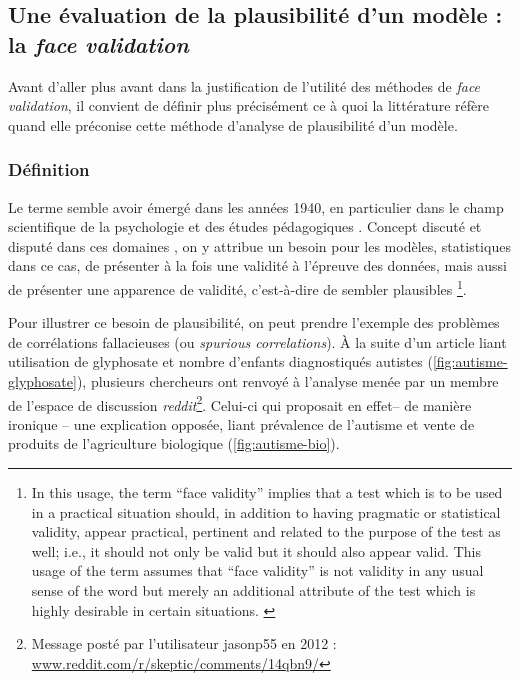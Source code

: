 \subsection{Une évaluation de la plausibilité d'un modèle : la \og \textit{face validation}\fg{}}\label{subsec:face-validity}

Avant d'aller plus avant dans la justification de l'utilité des méthodes de \textit{face validation}, il convient de définir plus précisément ce à quoi la littérature réfère quand elle préconise cette méthode d'analyse de plausibilité d'un modèle.

\subsubsection{Définition}
Le terme semble avoir émergé dans les années 1940, en particulier dans le champ scientifique de la psychologie et des études pédagogiques \autocite{nevo_face_1985}.
Concept discuté et disputé dans ces domaines \autocite{mosier_critical_1947}, on y attribue un besoin pour les modèles, statistiques dans ce cas, de présenter à la fois une validité à l'épreuve des données, mais aussi de présenter une apparence de validité, c'est-à-dire de sembler plausibles
\footnote{
	\og
	In this usage, the term ``face validity'' implies that a test which is to be used in a practical situation should, in addition to having pragmatic or statistical validity, appear practical, pertinent and related to the purpose of the test as well; i.e., it should not only be valid but it should also appear valid.
	This usage of the term assumes that ``face validity'' is not validity in any usual sense of the word but merely an additional attribute of the test which is highly desirable in certain situations.
	\fg{} \textcite[192]{mosier_critical_1947}
}.

Pour illustrer ce besoin de \og plausibilité\fg{}, on peut prendre l'exemple des problèmes de corrélations fallacieuses (ou \og \textit{spurious correlations}\fg{}).
À la suite d'un article \autocite{shaw_elevated_2017} liant utilisation de glyphosate et nombre d'enfants diagnostiqués autistes (\cref{fig:autisme-glyphosate}), plusieurs chercheurs ont renvoyé à l'analyse menée par un membre de l'espace de discussion \textit{reddit}\footnote{
	Message posté par l'utilisateur \og jasonp55\fg{} en 2012 : \\ \href{https://www.reddit.com/r/skeptic/comments/14qbn9/rskeptic_i_was_practicing_graphpad_and_i_think_i/}{www.reddit.com/r/skeptic/comments/14qbn9/}
}.
Celui-ci qui proposait en effet-- de manière ironique -- une explication opposée, liant prévalence de l'autisme et vente de produits de  l'agriculture biologique (\cref{fig:autisme-bio}).

